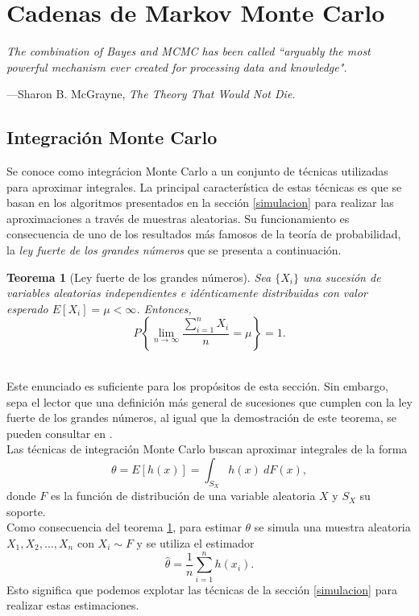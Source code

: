\documentclass[11pt,a4paper]{article}
\newtheorem{theorem}{Teorema}[section]
\begin{document}
\newpage

\section{Cadenas de Markov Monte Carlo}	
\label{sec_cadenas}
\epigraph{\itshape The combination of Bayes and MCMC has been called ``arguably the most powerful mechanism ever created for processing data and knowledge".}{---Sharon B. McGrayne, \textit{The Theory That Would Not Die.}}
\subsection{Integración Monte Carlo}

Se conoce como integrácion Monte Carlo a un conjunto de técnicas utilizadas para aproximar integrales. La principal característica de estas técnicas es que se basan en los algoritmos presentados en la sección \ref{simulacion} para realizar las aproximaciones a través de muestras aleatorias. Su funcionamiento es consecuencia de uno de los resultados más famosos de la teoría de probabilidad, la \textit{ley fuerte de los grandes números} que se presenta a continuación.\\

\begin{theorem}[Ley fuerte de los grandes números]
\label{grandes_numeros}
Sea $\lbrace X_i \rbrace$ una sucesión de variables aleatorias independientes e idénticamente distribuidas con valor esperado $E[X_i]=\mu < \infty$. Entonces,
$$P\left\lbrace \lim_{n \to \infty} \frac{\sum_{i=1}^{n} X_i}{n} = \mu \right\rbrace = 1.$$\\
\end{theorem}

Este enunciado es suficiente para los propósitos de esta sección. Sin embargo, sepa el lector que una definición más general de sucesiones que cumplen con la ley fuerte de los grandes números, al igual que la demostración de este teorema, se pueden consultar en \citet{feller}.\\

Las técnicas de integración Monte Carlo buscan aproximar integrales de la forma
$$\theta = E[h(x)] = \int_{S_X} h(x) \ dF(x),$$ donde $F$ es la función de distribución de una variable aleatoria $X$ y $S_X$ su soporte.\\

Como consecuencia del teorema \ref{grandes_numeros}, para estimar $\theta$ se simula una muestra aleatoria $X_1, X_2, \dots, X_n$ con $X_i\sim F$ y se utiliza el estimador $$\hat{\theta} = \frac{1}{n}\sum_{i=1}^n h(x_i).$$ Esto significa que podemos explotar las técnicas de la sección \ref{simulacion} para realizar estas estimaciones.\\
\end{document}
